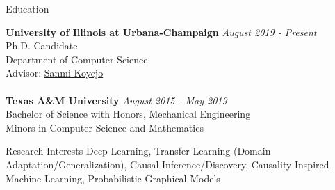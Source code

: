 \documentclass{resume} %
\begin{document}

\begin{rSection}{Education}

{\bf University of Illinois at Urbana-Champaign} \hfill {\em August 2019 - Present} 
\\ Ph.D. Candidate
\\ Department of Computer Science
\\Advisor: \href{http://sanmi.cs.illinois.edu/}{Sanmi Koyejo}\\
\\{\bf Texas A\&M University} \hfill {\em August 2015 - May 2019} 
\\ Bachelor of Science with Honors, Mechanical Engineering
\\ Minors in Computer Science and Mathematics
\end{rSection}

\begin{rSection}{Research Interests}
Deep Learning, Transfer Learning (Domain Adaptation/Generalization), Causal Inference/Discovery, Causality-Inspired Machine Learning, Probabilistic Graphical Models
\end{rSection}
\end{document}
